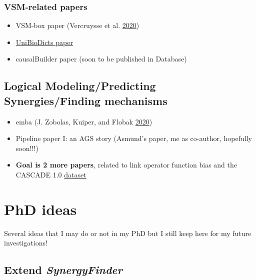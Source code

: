 \documentclass[
  12pt,
]{book}
\providecommand{\tightlist}{%
  \setlength{\itemsep}{0pt}\setlength{\parskip}{0pt}}
\begin{document}
\hypertarget{vsm-related-papers}{%
\subsection*{VSM-related papers}\label{vsm-related-papers}}

\begin{itemize}
\tightlist
\item
  VSM-box paper (Vercruysse et al. \protect\hyperlink{ref-vercruysse2020vsm}{2020})
\item
  \protect\hyperlink{vsm}{UniBioDicts paper}
\item
  causalBuilder paper (soon to be published in Database)
\end{itemize}

\hypertarget{logical-modelingpredicting-synergiesfinding-mechanisms}{%
\section*{Logical Modeling/Predicting Synergies/Finding mechanisms}\label{logical-modelingpredicting-synergiesfinding-mechanisms}}

\begin{itemize}
\tightlist
\item
  emba (J. Zobolas, Kuiper, and Flobak \protect\hyperlink{ref-Zobolas2020}{2020})
\item
  Pipeline paper I: an AGS story (Asmund's paper, me as co-author, hopefully soon!!!)
\item
  \textbf{Goal is 2 more papers}, related to link operator function bias and the CASCADE 1.0 \href{https://doi.org/10.5281/zenodo.4022783}{dataset}
\end{itemize}

\hypertarget{phd-ideas}{%
\chapter{PhD ideas}\label{phd-ideas}}

Several ideas that I may do or not in my PhD but I still keep here for my future
investigations!

\hypertarget{synergy-finder}{%
\section*{\texorpdfstring{Extend \emph{SynergyFinder}}{Extend SynergyFinder}}\label{synergy-finder}}
\end{document}
